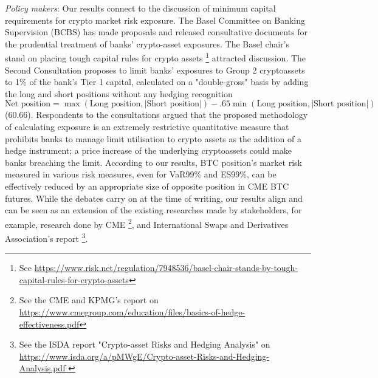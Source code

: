 \textit{Policy makers}:
Our results connect to the discussion of minimum capital requirements for crypto market risk exposure.
The Basel Committee on Banking Supervision (BCBS) has made proposals and released consultative documents for the prudential treatment of banks' crypto-asset exposures.
The Basel chair's stand on placing tough capital rules for crypto assets \footnote{See \url{https://www.risk.net/regulation/7948536/basel-chair-stands-by-tough-capital-rules-for-crypto-assets}} attracted discussion.
The Second Consultation proposes to limit banks' exposures to Group 2 cryptoassets to 1\% of the bank's Tier 1 capital,
calculated on a "double-gross" basis by adding the long and short positions without any hedging recognition
$\text{Net position} = \max \left(
\text{Long position}, |\text{Short position}|
\right)
- .65 \min\left(
\text{Long position}, |\text{Short position}|
\right)$ (60.66).
Respondents to the consultations argued that the proposed methodology of calculating exposure is an extremely restrictive quantitative measure that prohibits banks to manage limit utilisation to crypto assets as the addition of a hedge instrument;
a price increase of the underlying cryptoassets could make banks breaching the limit.
According to our results, BTC position's market risk measured in various risk measures,
even for VaR99\% and ES99\%, can be effectively reduced by an appropriate size of opposite position in CME BTC futures.
While the debates carry on at the time of writing, our results align and can be seen as an extension of the existing researches made by stakeholders,
for example, research done by CME \footnote{See the CME and KPMG's report on \url{https://www.cmegroup.com/education/files/basics-of-hedge-effectiveness.pdf}},
and International Swaps and Derivatives Association's report \footnote{See the ISDA report "Crypto-asset Risks and Hedging Analysis" on \url{https://www.isda.org/a/pMWgE/Crypto-asset-Risks-and-Hedging-Analysis.pdf }}.


